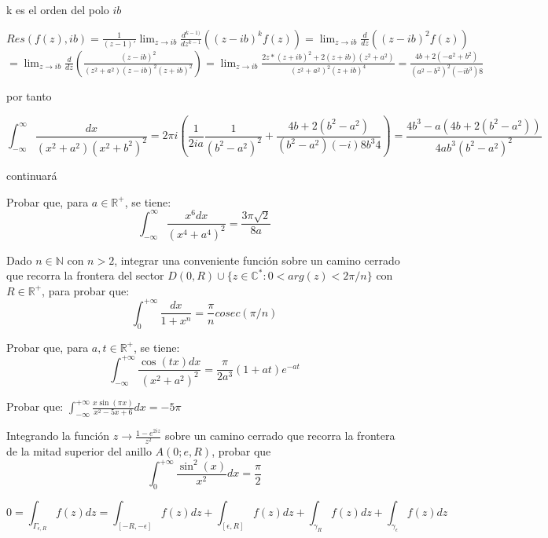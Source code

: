 \begin{sol}
k es el orden del polo $ib$

$Res(f(z),ib) = \frac{1}{(z-1)'} \lim_{z\rightarrow ib} \frac{d^{k-1)}}{dz^{k-1}} ((z-ib)^k f(z)) = \lim_{z\rightarrow ib} \frac{d}{dz} ((z-ib)^2 f(z)) $
$= \lim_{z\rightarrow ib} \frac{d}{dz} \left( \frac{(z-ib)^2}{(z^2+a^2)(z-ib)^2(z+ib)^2}  \right) 
= \lim_{z\rightarrow ib}\frac{2z*(z+ib)^2 + 2(z+ib)(z^2+a^2)}{(z^2+a^2)^2 (z+ib)^4}
= \frac{4b + 2(-a^2+b^2)}{(a^2-b^2)^2 (-ib^3)8}  $

por tanto

$$ \int_{-\infty}^{\infty} \frac{dx}{(x^2+a^2)(x^2+b^2)^2} = 
2\pi i \left( \frac{1}{2ia}\frac{1}{(b^2-a^2)^2} + \frac{4b+2(b^2-a^2)}{(b^2-a^2)(-i)8b^3 4} \right) =
\frac{4b^3-a(4b+2(b^2-a^2))}{4ab^3(b^2-a^2)^2}$$

continuará

\end{sol}


\begin{ejer}
	Probar que, para $a\in\mathbb{R}^+$, se tiene:
	$$ \int_{-\infty}^{\infty} \frac{x^6dx}{(x^4+a^4)^2} = \frac{3\pi\sqrt{2}}{8a} $$
\end{ejer}


\begin{ejer}
	Dado $n\in\mathbb{N}$ con $n>2$, integrar una conveniente función sobre un camino cerrado que recorra la frontera del sector $D(0,R) \cup \{ z\in\mathbb{C}^{\ast} : 0<arg(z)<2\pi/n \}$ con $R\in\mathbb{R}^+$, para probar que:
	$$ \int_{0}^{+\infty} \frac{dx}{1+x^n} = \frac{\pi}{n} cosec(\pi/n) $$
\end{ejer}

\begin{ejer}
	Probar que, para $a,t\in\mathbb{R}^+$, se tiene:
	$$ \int_{-\infty}^{+\infty} \frac{\cos(tx)dx}{(x^2+a^2)^2} = \frac{\pi}{2a^3}(1+at)e^{-at} $$
\end{ejer}

\begin{ejer}
	Probar que: $\int_{-\infty}^{+\infty} \frac{x\sin(\pi x)}{x^2-5x+6} dx = -5\pi $ 
\end{ejer}


\begin{ejer}
	Integrando la función $z\rightarrow\frac{1-e^{2iz}}{z^2}$ sobre un camino cerrado que recorra la frontera de la mitad superior del anillo $A(0;e,R)$, probar que
	$$ \int_{0}^{+\infty} \frac{\sin^2(x)}{x^2}dx = \frac{\pi}{2} $$
\end{ejer}

\begin{equation}
	0 = \int_{\Gamma_{\epsilon,R}} f(z)dz = \int_{[-R,-\epsilon]}f(z)dz + \int_{[\epsilon,R]} f(z)dz + \int_{\gamma_R} f(z)dz + \int_{\gamma_{\epsilon}} f(z)dz
	\label{ej9-integrales}
\end{equation}

